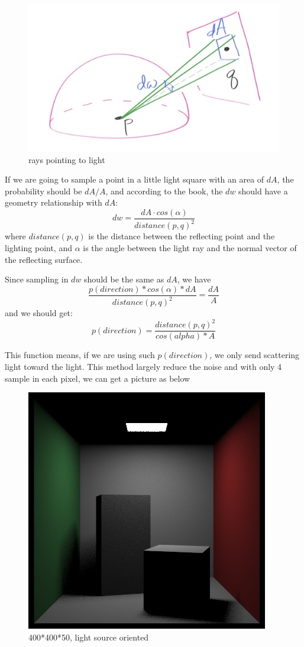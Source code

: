 \documentclass[10pt,conference,compsoc]{IEEEtran}
\begin{document}
\begin{figure}[H]
	\centering
	\includegraphics[scale=0.2]{./pic/MC3.png}
	\caption{rays pointing to light}
	\label{fig:label}
\end{figure}

If we are going to sample a point in a little light square with an area of $dA$, the probability should be $dA/A$, and according to the book, the $dw$ should have a geometry relationship with $dA$:
$$
dw = \frac{dA \cdot cos(\alpha)}{distance(p,q)^2}
$$
where $distance(p,q)$ is the distance between the reflecting point and the lighting point, and $\alpha$ is the angle between the light ray and the normal vector of the reflecting surface.



Since sampling in $dw$ should be the same as $dA$, we have
$$
\frac{p(direction)*cos(\alpha)*dA}{distance(p,q)^2} = \frac{dA}{ A}
$$
and we should get:
$$
p(direction) =\frac{distance(p,q)^2} {cos(alpha) *A}
$$

This function means, if we are using such $p(direction)$, we only send scattering light toward the light. This method largely reduce the noise and with only 4 sample in each pixel, we can get a picture as below
	\begin{figure}[H]
	\centering
	\includegraphics[scale=0.3]{./pic/MC2.png}
	\caption{400*400*50, light source oriented }
	\label{fig:label}
\end{figure}





	
	
\end{document}
